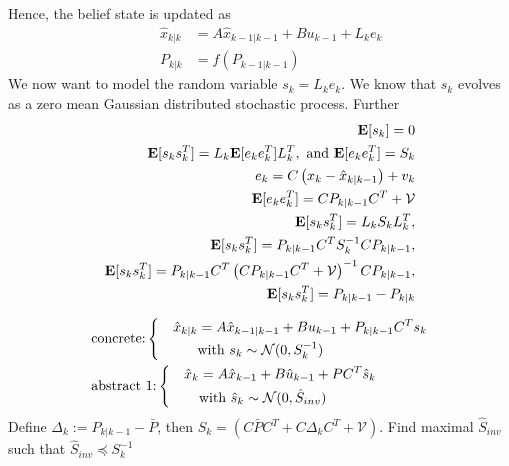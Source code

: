 \documentclass{ifacconf}
\begin{document}
Hence, the belief state is updated as
\begin{align}
	&&\hat x_{k|k}&=A\hat x_{k-1|k-1}+Bu_{k-1}+L_ke_k\\
	&&P_{k|k}&=f(P_{k-1|k-1})
\end{align}
We now want to model the random variable $s_k=L_ke_k$. We know that $s_k$ evolves as a zero mean Gaussian distributed stochastic process.
Further 
\begin{align*}
	\mathbf{E} [s_k]=0\\
	\mathbf{E} [s_ks_k^T]=L_k	\mathbf{E} [e_ke_k^T]L_k^T, \mbox{ and } \mathbf{E} [e_ke_k^T]=S_k \\
	e_k = C\left(x_k- \hat x_{k|k-1}\right)+v_k\\
	\mathbf{E} [e_ke_k^T] = C P_{k|k-1} C^T + \mathcal{V}\\
		\mathbf{E} [s_ks_k^T]=L_k S_k L_k^T,\\
				\mathbf{E} [s_ks_k^T]= P_{k|k-1} C^T S_k^{-1} C P_{k|k-1},\\
								\mathbf{E} [s_ks_k^T]= P_{k|k-1} C^T \left(CP_{k|k-1}C^T+\mathcal V\right)^{-1} C P_{k|k-1},\notag\\
\mathbf{E} [s_ks_k^T]= P_{k|k-1}-P_{k|k}\notag
\end{align*}


\begin{align}
	&\text{concrete:}\left\{\begin{aligned}
		&&\hat x_{k|k}&=A\hat x_{k-1|k-1}+Bu_{k-1}+ P_{k|k-1} C^T  \relax{s}_k\notag \\
		&&&\mbox{with } \relax{s}_k\sim \mathcal{N} (0,S_k^{-1}) \notag 
	\end{aligned}\right.	\\
&		\text{abstract 1:}\left\{\begin{aligned}
		&&\hat x_k &=A\hat x_{k-1} +B\hat u_{k-1} + \relax P  C^T  \hat{s}_k\notag \\
		&&&\mbox{with } \hat{s}_k\sim \mathcal{N} (0,\hat{S}_{inv}) \notag 
	\end{aligned}\right.	
\end{align}
Define  $\Delta_k:=P_{k|k-1} -\bar P $,  then  $S_k=\left(C\bar PC^T+C\Delta_kC^T+\mathcal V\right)$.
Find maximal $\hat{S}_{inv}$ such that $\hat{S}_{inv}\preceq S_k^{-1}$
\end{document}
